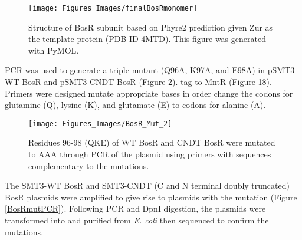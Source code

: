 \documentclass[12pt,twoside]{reedthesis}
\begin{document}
   	 	\begin{figure}[H]
 
   	 		\centering
   	 		\texttt{[image: Figures\_Images/finalBosRmonomer]}
   	 			\caption[Predicted structure BosR Monomer]{Structure of BosR subunit based on Phyre2 prediction given Zur as the template protein (PDB ID 4MTD). This figure was generated with PyMOL.}
   	 		\label{BosRMonomer_results}
   	 	\end{figure}
   	 	
   	 	
   
   	 	
   	 	PCR was used to generate a triple mutant (Q96A, K97A, and E98A) in pSMT3-WT BosR and pSMT3-CNDT BosR (Figure \ref{BosRMut_Scheme}). tag to MntR (Figure 18). Primers were designed mutate appropriate bases in order change the codons for glutamine (Q), lysine (K), and glutamate (E) to codons for alanine (A).  
   	 	\clearpage
      	\begin{figure}[h!tbp]
      		
      		\centering
      		\texttt{[image: Figures\_Images/BosR\_Mut\_2]}
      		\caption[BosR Site-Directed Mutagenesis]{Residues 96-98 (QKE) of WT BosR and CNDT BosR  were mutated to AAA through PCR of the plasmid using primers with sequences complementary to the mutations. }
      		\label{BosRMut_Scheme}
      	\end{figure}
      	
 The SMT3-WT BosR and SMT3-CNDT (C and N terminal doubly truncated) BosR plasmids were amplified to give rise to plasmids with the mutation (Figure \ref{BosRmutPCR}). Following PCR and DpnI digestion, the plasmids were transformed into and purified from \textit{E. coli} then sequenced to confirm the mutations. 
 
\end{document}
